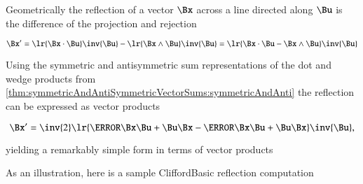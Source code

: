 %
%

Geometrically the reflection of a vector \( \Bx \) across a line directed along \( \Bu \) is the difference of the projection and rejection

\begin{dmath}\label{eqn:reflection:900}
\Bx'
= \lr{ \Bx \cdot \Bu } \inv{\Bu} - \lr{ \Bx \wedge \Bu } \inv{\Bu }
= \lr{ \Bx \cdot \Bu - \Bx \wedge \Bu } \inv{\Bu }
\end{dmath}

Using the symmetric and antisymmetric sum representations of the dot and wedge products from
\cref{thm:symmetricAndAntiSymmetricVectorSums:symmetricAndAnti}
the reflection can be expressed as vector products

\begin{dmath}\label{eqn:reflection:940}
\Bx'
= \inv{2} \lr{ \cancel{\Bx \Bu} + \Bu \Bx - \cancel{\Bx \Bu} + \Bu \Bx } \inv{\Bu },
\end{dmath}

yielding a remarkably simple form in terms of vector products


As an illustration, here is a sample CliffordBasic reflection computation


